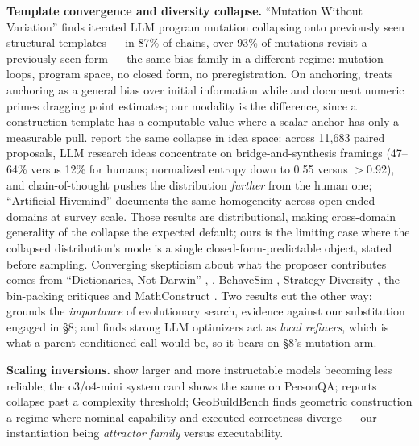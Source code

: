 \textbf{Template convergence and diversity collapse.} ``Mutation Without Variation'' \citep{gurkan2026mutationvariationconvergencedynamics}
finds iterated LLM program mutation collapsing onto previously
seen structural templates --- in 87\% of chains, over 93\% of mutations revisit a previously seen
form --- the same bias family in a different regime: mutation loops, program space, no closed form,
no preregistration. On anchoring, \citet{huang2026understandinganchoringeffectllm} treats anchoring
as a general bias over initial information while \citet{lou2024anchoringbiaslargelanguage} and
\citet{malberg2025comprehensiveevaluationcognitivebiases} document numeric primes dragging point
estimates; our modality is the difference, since a construction template has a computable value
where a scalar anchor has only a measurable pull. \citet{chen2026measuringgaphumanllm} report the
same collapse in idea space: across 11,683 paired proposals, LLM research ideas concentrate on
bridge-and-synthesis framings (47--64\% versus 12\% for humans; normalized entropy down to 0.55
versus $>$0.92), and chain-of-thought pushes the distribution \emph{further} from the human one;
``Artificial Hivemind'' \citep{jiang2025artificialhivemindopenendedhomogeneity} documents the same
homogeneity across open-ended domains at survey scale. Those results are distributional, making
cross-domain generality of the collapse the expected default; ours is the limiting case where the
collapsed distribution's mode is a single closed-form-predictable object, stated before sampling.
Converging skepticism about what the proposer contributes comes from ``Dictionaries, Not Darwin'' \citep{li2026dictionariesdarwinsetlevelselection}, \citet{wang2026diversescientifichypothesissearch}, BehaveSim
\citep{zhang2026rethinkingcodesimilarityautomated}, Strategy Diversity \citep{yang2026accuracyevaluatingstrategydiversity}, the bin-packing critiques \citep{herrmann2026indepthstudyllmcontributions,sim2025hypebenchmarkingllmevolvedheuristics} and MathConstruct \citep{balunovic2025mathconstructchallengingllmreasoning}. Two results cut the other way: \citet{zhang2024understandingimportanceevolutionarysearch} grounds the
\emph{importance} of evolutionary search, evidence against our substitution engaged in \S8; and
\citet{zhang2026makesllmgoodoptimizer} finds strong LLM optimizers act as \emph{local refiners},
which is what a parent-conditioned call would be, so it bears on \S8's mutation arm.

\textbf{Scaling inversions.} \citet{zhou2024reliability} show larger and more instructable models
becoming less reliable; the o3/o4-mini system card \citep{openai2025o3o4systemcard} shows the same on PersonQA; \citet{shojaee2025illusionthinkingunderstandingstrengths}
reports collapse past a complexity threshold; GeoBuildBench \citep{kim2026geobuildbenchbenchmarkinteractiveexecutable} finds geometric
construction a regime where nominal capability and executed correctness diverge --- our
instantiation being \emph{attractor family} versus executability.

